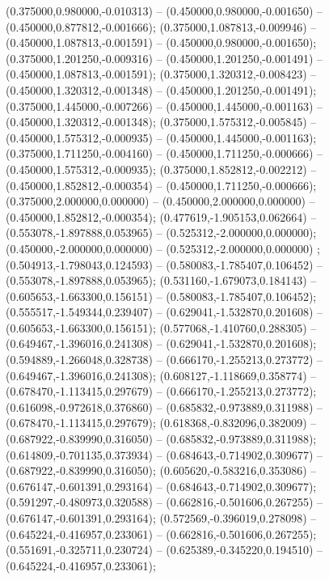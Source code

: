  (0.375000,0.980000,-0.010313) -- (0.450000,0.980000,-0.001650) -- (0.450000,0.877812,-0.001666);
 (0.375000,1.087813,-0.009946) -- (0.450000,1.087813,-0.001591) -- (0.450000,0.980000,-0.001650);
 (0.375000,1.201250,-0.009316) -- (0.450000,1.201250,-0.001491) -- (0.450000,1.087813,-0.001591);
 (0.375000,1.320312,-0.008423) -- (0.450000,1.320312,-0.001348) -- (0.450000,1.201250,-0.001491);
 (0.375000,1.445000,-0.007266) -- (0.450000,1.445000,-0.001163) -- (0.450000,1.320312,-0.001348);
 (0.375000,1.575312,-0.005845) -- (0.450000,1.575312,-0.000935) -- (0.450000,1.445000,-0.001163);
 (0.375000,1.711250,-0.004160) -- (0.450000,1.711250,-0.000666) -- (0.450000,1.575312,-0.000935);
 (0.375000,1.852812,-0.002212) -- (0.450000,1.852812,-0.000354) -- (0.450000,1.711250,-0.000666);
 (0.375000,2.000000,0.000000) -- (0.450000,2.000000,0.000000) -- (0.450000,1.852812,-0.000354);
 (0.477619,-1.905153,0.062664) -- (0.553078,-1.897888,0.053965) -- (0.525312,-2.000000,0.000000);
 (0.450000,-2.000000,0.000000) -- (0.525312,-2.000000,0.000000) ;
 (0.504913,-1.798043,0.124593) -- (0.580083,-1.785407,0.106452) -- (0.553078,-1.897888,0.053965);
 (0.531160,-1.679073,0.184143) -- (0.605653,-1.663300,0.156151) -- (0.580083,-1.785407,0.106452);
 (0.555517,-1.549344,0.239407) -- (0.629041,-1.532870,0.201608) -- (0.605653,-1.663300,0.156151);
 (0.577068,-1.410760,0.288305) -- (0.649467,-1.396016,0.241308) -- (0.629041,-1.532870,0.201608);
 (0.594889,-1.266048,0.328738) -- (0.666170,-1.255213,0.273772) -- (0.649467,-1.396016,0.241308);
 (0.608127,-1.118669,0.358774) -- (0.678470,-1.113415,0.297679) -- (0.666170,-1.255213,0.273772);
 (0.616098,-0.972618,0.376860) -- (0.685832,-0.973889,0.311988) -- (0.678470,-1.113415,0.297679);
 (0.618368,-0.832096,0.382009) -- (0.687922,-0.839990,0.316050) -- (0.685832,-0.973889,0.311988);
 (0.614809,-0.701135,0.373934) -- (0.684643,-0.714902,0.309677) -- (0.687922,-0.839990,0.316050);
 (0.605620,-0.583216,0.353086) -- (0.676147,-0.601391,0.293164) -- (0.684643,-0.714902,0.309677);
 (0.591297,-0.480973,0.320588) -- (0.662816,-0.501606,0.267255) -- (0.676147,-0.601391,0.293164);
 (0.572569,-0.396019,0.278098) -- (0.645224,-0.416957,0.233061) -- (0.662816,-0.501606,0.267255);
 (0.551691,-0.325711,0.230724) -- (0.625389,-0.345220,0.194510) -- (0.645224,-0.416957,0.233061);
